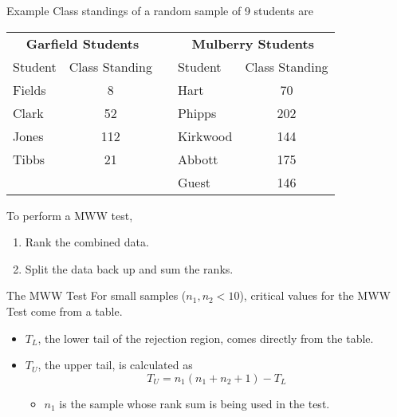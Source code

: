 \begin{frame}{Example}
    Class standings of a random sample of 9 students are
    \begin{table}[h]
        \centering
        \begin{tabular}{lc c lc}
            \multicolumn{2}{c}{\textbf{Garfield Students}} && \multicolumn{2}{c}{\textbf{Mulberry Students}}  \\
            \cline{1-2} \cline{4-5}
            Student & Class Standing && Student & Class Standing \\
            \cline{1-2} \cline{4-5}
            Fields & 8 && Hart & 70 \\
            Clark & 52 && Phipps & 202 \\
            Jones & 112 && Kirkwood & 144 \\
            Tibbs & 21 && Abbott & 175 \\
            &&& Guest & 146 \\
        \end{tabular}
    \end{table}
    To perform a MWW test, 
    \begin{enumerate}
        \item Rank the combined data.
        \item Split the data back up and sum the ranks.
    \end{enumerate}
\end{frame}

\begin{frame}{The MWW Test}
    For small samples ($n_1, n_2 < 10$), critical values for the MWW Test come from a table.
    \begin{itemize}
        \item $T_L$, the lower tail of the rejection region, comes directly from the table.
        \item $T_U$, the upper tail, is calculated as
        \[
            T_U = n_1(n_1 + n_2 + 1) - T_L
        \]
        \begin{itemize}
            \item $n_1$ is the sample whose rank sum is being used in the test. 
        \end{itemize}
    \end{itemize}
\end{frame}

